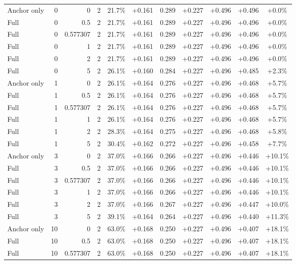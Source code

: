 \begin{table}[htbp]
\begin{tabular}{lrrrccccccc}
Anchor only & 0 & 0 & 2 & 21.7\% & +0.161 & 0.289 & +0.227 & +0.496 & +0.496 & +0.0\% \\
Full & 0 & 0.5 & 2 & 21.7\% & +0.161 & 0.289 & +0.227 & +0.496 & +0.496 & +0.0\% \\
Full & 0 & 0.577307 & 2 & 21.7\% & +0.161 & 0.289 & +0.227 & +0.496 & +0.496 & +0.0\% \\
Full & 0 & 1 & 2 & 21.7\% & +0.161 & 0.289 & +0.227 & +0.496 & +0.496 & +0.0\% \\
Full & 0 & 2 & 2 & 21.7\% & +0.161 & 0.289 & +0.227 & +0.496 & +0.496 & +0.0\% \\
Full & 0 & 5 & 2 & 26.1\% & +0.160 & 0.284 & +0.227 & +0.496 & +0.485 & +2.3\% \\
Anchor only & 1 & 0 & 2 & 26.1\% & +0.164 & 0.276 & +0.227 & +0.496 & +0.468 & +5.7\% \\
Full & 1 & 0.5 & 2 & 26.1\% & +0.164 & 0.276 & +0.227 & +0.496 & +0.468 & +5.7\% \\
Full & 1 & 0.577307 & 2 & 26.1\% & +0.164 & 0.276 & +0.227 & +0.496 & +0.468 & +5.7\% \\
Full & 1 & 1 & 2 & 26.1\% & +0.164 & 0.276 & +0.227 & +0.496 & +0.468 & +5.7\% \\
Full & 1 & 2 & 2 & 28.3\% & +0.164 & 0.275 & +0.227 & +0.496 & +0.468 & +5.8\% \\
Full & 1 & 5 & 2 & 30.4\% & +0.162 & 0.272 & +0.227 & +0.496 & +0.458 & +7.7\% \\
Anchor only & 3 & 0 & 2 & 37.0\% & +0.166 & 0.266 & +0.227 & +0.496 & +0.446 & +10.1\% \\
Full & 3 & 0.5 & 2 & 37.0\% & +0.166 & 0.266 & +0.227 & +0.496 & +0.446 & +10.1\% \\
Full & 3 & 0.577307 & 2 & 37.0\% & +0.166 & 0.266 & +0.227 & +0.496 & +0.446 & +10.1\% \\
Full & 3 & 1 & 2 & 37.0\% & +0.166 & 0.266 & +0.227 & +0.496 & +0.446 & +10.1\% \\
Full & 3 & 2 & 2 & 37.0\% & +0.166 & 0.267 & +0.227 & +0.496 & +0.447 & +10.0\% \\
Full & 3 & 5 & 2 & 39.1\% & +0.164 & 0.264 & +0.227 & +0.496 & +0.440 & +11.3\% \\
Anchor only & 10 & 0 & 2 & 63.0\% & +0.168 & 0.250 & +0.227 & +0.496 & +0.407 & +18.1\% \\
Full & 10 & 0.5 & 2 & 63.0\% & +0.168 & 0.250 & +0.227 & +0.496 & +0.407 & +18.1\% \\
Full & 10 & 0.577307 & 2 & 63.0\% & +0.168 & 0.250 & +0.227 & +0.496 & +0.407 & +18.1\% \\

\end{tabular}
\end{table}
